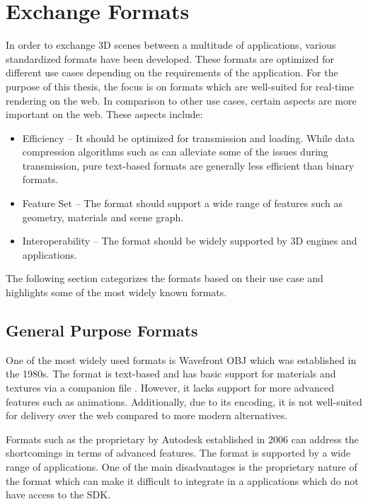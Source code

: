 \section{Exchange Formats}

In order to exchange 3D scenes between a multitude of applications, various standardized formats have been developed. These formats are optimized for different use cases depending on the requirements of the application. For the purpose of this thesis, the focus is on formats which are well-suited for real-time rendering on the web. In comparison to other use cases, certain aspects are more important on the web. These aspects include:

\begin{itemize}
    \item{Efficiency} – It should be optimized for transmission and loading. While data compression algorithms such as  can alleviate some of the issues during transmission, pure text-based formats are generally less efficient than binary formats.
    \item{Feature Set} – The format should support a wide range of features such as geometry, materials and scene graph.
    \item{Interoperability} – The format should be widely supported by 3D engines and applications.
\end{itemize}

The following section categorizes the formats based on their use case and highlights some of the most widely known formats.

\subsection*{General Purpose Formats}

One of the most widely used formats is Wavefront \gls{OBJ} which was established in the 1980s. The format is text-based and has basic support for materials and textures via a companion file . However, it lacks support for more advanced features such as animations. Additionally, due to its encoding, it is not well-suited for delivery over the web compared to more modern alternatives.

Formats such as the proprietary  by Autodesk established in 2006 can address the shortcomings in terms of advanced features. The format is supported by a wide range of applications. One of the main disadvantages is the proprietary nature of the format  which can make it difficult to integrate in a applications which do not have access to the SDK.

